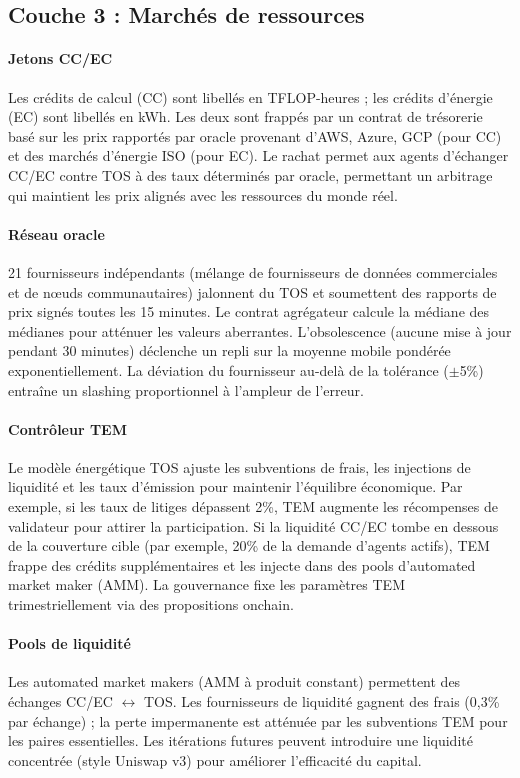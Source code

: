 \documentclass[11pt]{article}
\begin{document}
\subsection{Couche 3 : Marchés de ressources}
\paragraph{Jetons CC/EC} Les crédits de calcul (CC) sont libellés en TFLOP-heures ; les crédits d'énergie (EC) sont libellés en kWh. Les deux sont frappés par un contrat de trésorerie basé sur les prix rapportés par oracle provenant d'AWS, Azure, GCP (pour CC) et des marchés d'énergie ISO (pour EC). Le rachat permet aux agents d'échanger CC/EC contre TOS à des taux déterminés par oracle, permettant un arbitrage qui maintient les prix alignés avec les ressources du monde réel.

\paragraph{Réseau oracle} 21 fournisseurs indépendants (mélange de fournisseurs de données commerciales et de nœuds communautaires) jalonnent du TOS et soumettent des rapports de prix signés toutes les 15 minutes. Le contrat agrégateur calcule la médiane des médianes pour atténuer les valeurs aberrantes. L'obsolescence (aucune mise à jour pendant 30 minutes) déclenche un repli sur la moyenne mobile pondérée exponentiellement. La déviation du fournisseur au-delà de la tolérance ($\pm$5\%) entraîne un slashing proportionnel à l'ampleur de l'erreur.

\paragraph{Contrôleur TEM} Le modèle énergétique TOS ajuste les subventions de frais, les injections de liquidité et les taux d'émission pour maintenir l'équilibre économique. Par exemple, si les taux de litiges dépassent 2\%, TEM augmente les récompenses de validateur pour attirer la participation. Si la liquidité CC/EC tombe en dessous de la couverture cible (par exemple, 20\% de la demande d'agents actifs), TEM frappe des crédits supplémentaires et les injecte dans des pools d'automated market maker (AMM). La gouvernance fixe les paramètres TEM trimestriellement via des propositions onchain.

\paragraph{Pools de liquidité} Les automated market makers (AMM à produit constant) permettent des échanges CC/EC $\leftrightarrow$ TOS. Les fournisseurs de liquidité gagnent des frais (0,3\% par échange) ; la perte impermanente est atténuée par les subventions TEM pour les paires essentielles. Les itérations futures peuvent introduire une liquidité concentrée (style Uniswap v3) pour améliorer l'efficacité du capital.
\end{document}

